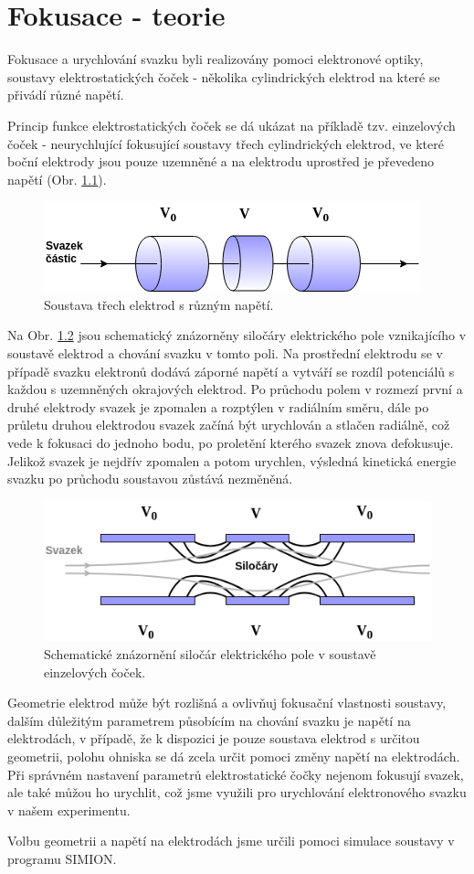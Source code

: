 \newpage
\chapter{Fokusace - teorie} 

Fokusace a urychlování svazku byli realizovány pomoci elektronové optiky, soustavy elektrostatických čoček - několika cylindrických elektrod na které se přivádí různé napětí.  

Princip funkce elektrostatických čoček se dá ukázat na příkladě tzv. einzelových čoček - neurychlující fokusující soustavy třech cylindrických elektrod, ve které boční elektrody jsou pouze uzemněné a na elektrodu uprostřed je převedeno napětí (Obr. \ref{einzel}). 
\begin{figure}[H]
\includegraphics[width=.8\linewidth]{Figure/05/einzel.png}
\caption{Soustava třech elektrod s různým napětí.}
\label{einzel}
\end{figure}

Na Obr. \ref{pole} jsou schematický znázorněny siločáry elektrického pole vznikajícího v soustavě elektrod a chování svazku v tomto poli. Na prostřední elektrodu se v případě svazku elektronů dodává záporné napětí a vytváří se rozdíl potenciálů s každou s uzemněných okrajových elektrod. Po průchodu polem v rozmezí první a druhé elektrody svazek je zpomalen a rozptýlen v radiálním směru, dále po průletu druhou elektrodou svazek začíná být urychlován a stlačen radiálně, což vede k fokusaci do jednoho bodu, po proletění kterého svazek znova defokusuje. Jelikož svazek je nejdřív zpomalen a potom urychlen, výsledná kinetická energie svazku po průchodu soustavou zůstává nezměněná. 
\begin{figure}[H]
\includegraphics[width=.8\linewidth]{Figure/05/pole.png}
\caption{Schematické znázornění siločár elektrického pole v soustavě einzelových čoček.  }
\label{pole}
\end{figure}

Geometrie elektrod může být rozlišná a ovlivňuj fokusační vlastnosti soustavy, dalším důležitým parametrem působícím na chování svazku je napětí na elektrodách, v případě, že k dispozici je pouze soustava elektrod s určitou geometrii, polohu ohniska se dá zcela určit pomoci změny napětí na elektrodách. Při správném nastavení parametrů elektrostatické čočky nejenom fokusují svazek, ale také můžou ho urychlit, což jsme využili pro urychlování elektronového svazku v našem experimentu. 

Volbu geometrii a napětí na elektrodách jsme určili pomoci simulace soustavy v programu SIMION. 

